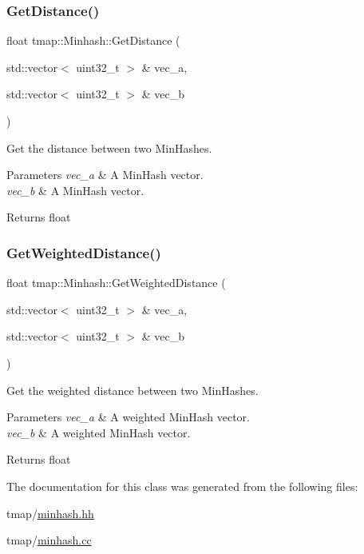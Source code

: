 \subsubsection{\texorpdfstring{Get\+Distance()}{GetDistance()}}
{\footnotesize\ttfamily float tmap\+::\+Minhash\+::\+Get\+Distance (\begin{DoxyParamCaption}\item[{std\+::vector$<$ uint32\+\_\+t $>$ \&}]{vec\+\_\+a,  }\item[{std\+::vector$<$ uint32\+\_\+t $>$ \&}]{vec\+\_\+b }\end{DoxyParamCaption})}



Get the distance between two Min\+Hashes. 


\begin{DoxyParams}{Parameters}
{\em vec\+\_\+a} & A Min\+Hash vector. \\
\hline
{\em vec\+\_\+b} & A Min\+Hash vector. \\
\hline
\end{DoxyParams}
\begin{DoxyReturn}{Returns}
float 
\end{DoxyReturn}
\mbox{\label{classtmap_1_1Minhash_a7a8090c1629a6783fe0e17b227bd59ca}} 
\subsubsection{\texorpdfstring{Get\+Weighted\+Distance()}{GetWeightedDistance()}}
{\footnotesize\ttfamily float tmap\+::\+Minhash\+::\+Get\+Weighted\+Distance (\begin{DoxyParamCaption}\item[{std\+::vector$<$ uint32\+\_\+t $>$ \&}]{vec\+\_\+a,  }\item[{std\+::vector$<$ uint32\+\_\+t $>$ \&}]{vec\+\_\+b }\end{DoxyParamCaption})}



Get the weighted distance between two Min\+Hashes. 


\begin{DoxyParams}{Parameters}
{\em vec\+\_\+a} & A weighted Min\+Hash vector. \\
\hline
{\em vec\+\_\+b} & A weighted Min\+Hash vector. \\
\hline
\end{DoxyParams}
\begin{DoxyReturn}{Returns}
float 
\end{DoxyReturn}


The documentation for this class was generated from the following files\+:\begin{DoxyCompactItemize}
\item 
tmap/\hyperlink{minhash_8hh}{minhash.\+hh}\item 
tmap/\hyperlink{minhash_8cc}{minhash.\+cc}\end{DoxyCompactItemize}
